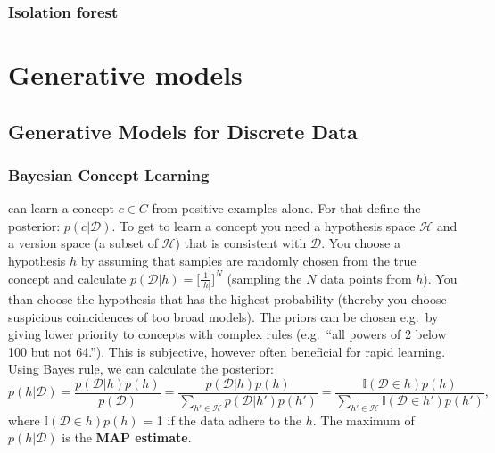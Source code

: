 \documentclass[
]{book}
\begin{document}
\hypertarget{isolation-forest}{%
\subsection{Isolation forest}\label{isolation-forest}}

\hypertarget{generative-models}{%
\chapter{Generative models}\label{generative-models}}

\hypertarget{generative-models-for-discrete-data}{%
\section{Generative Models for Discrete Data}\label{generative-models-for-discrete-data}}

\hypertarget{bayesian-concept-learning}{%
\subsection{Bayesian Concept Learning}\label{bayesian-concept-learning}}

can learn a concept \(c \in C\) from positive examples alone. For that
define the posterior: \(p(c|\mathcal{D})\). To get to learn a concept you
need a hypothesis space \(\mathcal{H}\) and a version space (a subset of
\(\mathcal{H}\)) that is consistent with \(\mathcal{D}\). You choose a
hypothesis \(h\) by assuming that samples are randomly chosen from the
true concept and calculate
\(p(\mathcal{D}|h)=\lbrack \frac{1}{|h|}\rbrack^N\) (sampling the \(N\) data
points from \(h\)). You than choose the hypothesis that has the highest
probability (thereby you choose suspicious coincidences of too broad
models). The priors can be chosen e.g.~by giving lower priority to
concepts with complex rules (e.g.~``all powers of 2 below 100 but not
64.''). This is subjective, however often beneficial for rapid learning.\\
Using Bayes rule, we can calculate the posterior:
\[p(h|\mathcal{D}) =\dfrac{p(\mathcal{D}|h)p(h)}{p(\mathcal{D})} =  \dfrac{p(\mathcal{D}|h)p(h)}{\sum_{h' \in \mathcal{H}}p(\mathcal{D}|h')p(h')}=\dfrac{\mathbb{I}(\mathcal{D} \in h)p(h)}{\sum_{h' \in \mathcal{H}}\mathbb{I}(\mathcal{D} \in h')p(h')},\]
where \(\mathbb{I}(\mathcal{D} \in h)p(h)\) = 1 if the data adhere to the
\(h\). The maximum of \(p(h|\mathcal{D})\) is the \textbf{MAP estimate}.
\end{document}
